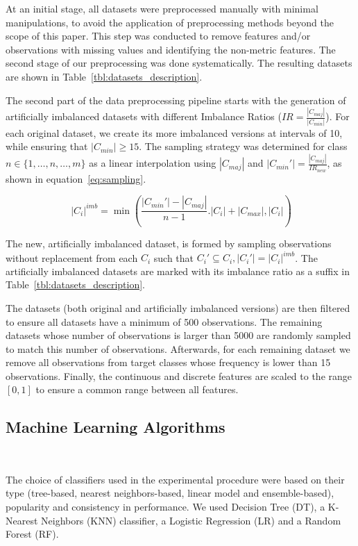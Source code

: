\documentclass[parskip=full]{scrartcl}
\begin{document}
At an initial stage, all datasets were preprocessed manually with minimal
manipulations, to avoid the application of preprocessing methods beyond the
scope of this paper. This step was conducted to remove features and/or
observations with missing values and identifying the non-metric features. The
second stage of our preprocessing was done systematically. The resulting
datasets are shown in Table~\ref{tbl:datasets_description}.



The second part of the data preprocessing pipeline starts with the generation
of artificially imbalanced datasets with different Imbalance Ratios
($IR=\frac{|C_{maj}|}{|C_{min}|}$). For each original dataset, we create its
more imbalanced versions at intervals of 10, while ensuring that $|C_{min}|
\ge 15$. The sampling strategy was determined for class $n \in
\{1,\ldots,n,\ldots,m\}$ as a linear interpolation using $|C_{maj}|$ and
$|C_{min}'|=\frac{|C_{maj}|}{IR_{new}}$, as shown in
equation~\ref{eq:sampling}.

\begin{equation}~\label{eq:sampling}
    |C_i|^{imb} =
    \min(\frac{|C_{min}'|-|C_{maj}|}{n-1}.|C_i|+|C_{max}|, |C_i|)
\end{equation}

The new, artificially imbalanced dataset, is formed by sampling observations
without replacement from each $C_i$ such that $C_i' \subseteq C_i , |C_i'| =
|C_i|^{imb}$. The artificially imbalanced datasets are marked with its
imbalance ratio as a suffix in Table~\ref{tbl:datasets_description}.

The datasets (both original and artificially imbalanced versions) are then
filtered to ensure all datasets have a minimum of 500 observations.  The
remaining datasets whose number of observations is larger than 5000 are
randomly sampled to match this number of observations. Afterwards, for each
remaining dataset we remove all observations from target classes whose
frequency is lower than 15 observations. Finally, the continuous and discrete
features are scaled to the range $[0,1]$ to ensure a common range between all
features. 

\subsection{Machine Learning Algorithms}~\label{sec:ml_algorithms}

The choice of classifiers used in the experimental procedure were based on
their type (tree-based, nearest neighbors-based, linear model and
ensemble-based), popularity and consistency in performance. We used Decision
Tree (DT), a K-Nearest Neighbors (KNN) classifier, a Logistic
Regression (LR) and a Random Forest (RF).
\end{document}
